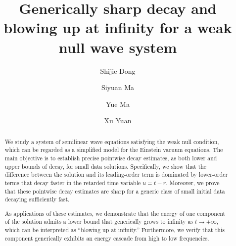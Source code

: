 \documentclass[a4paper,reqno]{amsart}
\theoremstyle{definition}
\numberwithin{equation}{section}
\begin{document}
	


	\title[Generically sharp decay for a weak null wave system]{Generically sharp decay and blowing up at infinity for a weak null wave system}

 \author[S.~Dong]{Shijie Dong}
	\address{Southern University of Science and Technology, Shenzhen International Center for Mathematics, and Department of Mathematics, 518055 Shenzhen,  China.}
	
	\author[S.~Ma]{Siyuan Ma}
	\address{State Key Laboratory of Mathematical Sciences, Academy of Mathematics and Systems Science, Chinese Academy of Sciences, Beijing 100190, China}
	
	\author[Y.~Ma]{Yue Ma}
	\address{Xi'an Jiaotong University, School of Mathematics and Statistics, 28 West Xianning Road, Xi'an Shaanxi 710049,  China.}
	
	
	\author[X.~Yuan]{Xu Yuan}
	\address{State Key Laboratory of Mathematical Sciences, Academy of Mathematics and Systems Science, Chinese Academy of Sciences, Beijing 100190, China}
	\begin{abstract}
We study a system of semilinear wave equations satisfying the weak null condition, which can be regarded as a simplified model for the Einstein vacuum equations. The main objective is to establish precise pointwise decay estimates, as both lower and upper bounds of decay, for small data solutions. Specifically, we show that the difference between the solution and its leading-order term is dominated by lower-order terms that decay faster in the retarded time variable $u = t-r$. Moreover, we prove that these pointwise decay estimates are sharp for a generic class of small initial data decaying sufficiently fast.

As applications of these estimates, we demonstrate that the energy of one component of the solution admits a lower bound that generically grows to infinity as $t \to +\infty$, which can be interpreted as “blowing up at infinity.” Furthermore, we verify that this component generically exhibits an energy cascade from high to low frequencies.
 \end{abstract}
	
    \maketitle
    \tableofcontents
    
\end{document}
